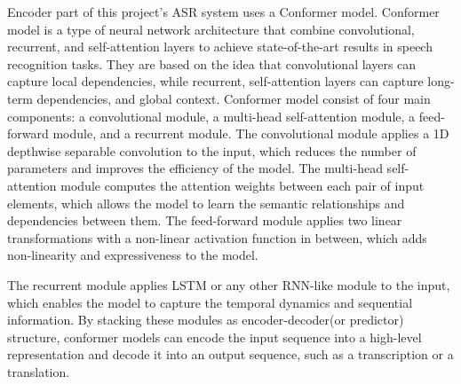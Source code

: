 \documentclass[9pt,final,a4paper]{IEEEtran}
\begin{document}
\begin{figure}[ht]
    \centering
\end{figure}

Encoder part of this project's ASR system uses a Conformer model.
Conformer model is a type of neural network architecture that combine convolutional, recurrent, and self-attention layers to achieve state-of-the-art results in speech recognition tasks.
They are based on the idea that convolutional layers can capture local dependencies, while recurrent, self-attention layers can capture long-term dependencies, and global context.
Conformer model consist of four main components: a convolutional module, a multi-head self-attention module, a feed-forward module, and a recurrent module.
The convolutional module applies a 1D depthwise separable convolution to the input, which reduces the number of parameters and improves the efficiency of the model.
The multi-head self-attention module computes the attention weights between each pair of input elements, which allows the model to learn the semantic relationships and dependencies between them.
The feed-forward module applies two linear transformations with a non-linear activation function in between, which adds non-linearity and expressiveness to the model\cite{cite5}.

The recurrent module applies LSTM or any other RNN-like module to the input, which enables the model to capture the temporal dynamics and sequential information.
By stacking these modules as encoder-decoder(or predictor) structure, conformer models can encode the input sequence into a high-level representation and decode it into an output sequence, such as a transcription or a translation\cite{cite5}.
\end{document}
